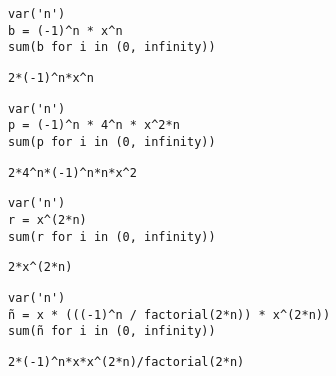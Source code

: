 \documentclass[
]{article}
\begin{document}
\begin{verbatim}
var('n')
b = (-1)^n * x^n
sum(b for i in (0, infinity))
\end{verbatim}

\begin{verbatim}
2*(-1)^n*x^n
\end{verbatim}

\begin{verbatim}
var('n')
p = (-1)^n * 4^n * x^2*n
sum(p for i in (0, infinity))
\end{verbatim}

\begin{verbatim}
2*4^n*(-1)^n*n*x^2
\end{verbatim}

\begin{verbatim}
var('n')
r = x^(2*n)
sum(r for i in (0, infinity))
\end{verbatim}

\begin{verbatim}
2*x^(2*n)
\end{verbatim}

\begin{verbatim}
var('n')
ñ = x * (((-1)^n / factorial(2*n)) * x^(2*n))
sum(ñ for i in (0, infinity))
\end{verbatim}

\begin{verbatim}
2*(-1)^n*x*x^(2*n)/factorial(2*n)
\end{verbatim}

\begin{verbatim}
\end{verbatim}
\end{document}
